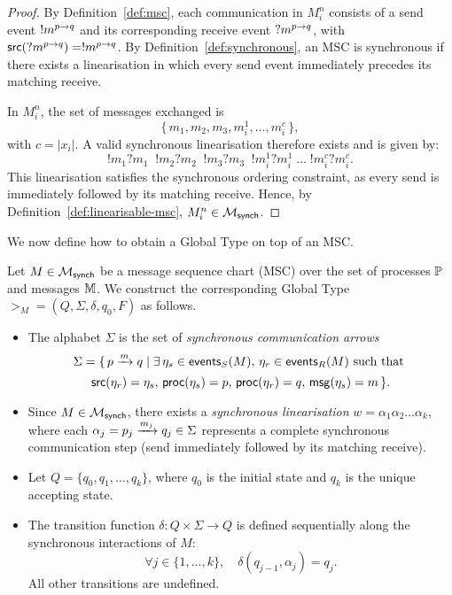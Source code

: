 \begin{proof}
By Definition~\ref{def:msc}, each communication in $M_i^n$
consists of a send event $\send{p}{q}{m}$ and its corresponding
receive event $\recv{p}{q}{m}$, with $\source(\recv{p}{q}{m}) =
\send{p}{q}{m}$.  
By Definition~\ref{def:synchronous}, an MSC is synchronous
if there exists a linearisation in which every send event
immediately precedes its matching receive.

In $M_i^n$, the set of messages exchanged is
\[
\{\, m_1, m_2, m_3, m_i^1, \ldots, m_i^c \,\},
\]
with $c = |x_i|$.  
A valid synchronous linearisation therefore exists and is given by:
\[
!m_1 ?m_1\;\; !m_2 ?m_2\;\; !m_3 ?m_3\;\;
!m_i^1 ?m_i^1 \;\ldots\; !m_i^c ?m_i^c.
\]
This linearisation satisfies the synchronous ordering constraint,
as every send is immediately followed by its matching receive.
Hence, by Definition~\ref{def:linearisable-msc},  
$M_i^n \in \mscsetofmodel{\synchmodel}$.
\end{proof}

We now define how to obtain a Global Type on top of an MSC.

\bigskip

\begin{definition}[$\gt_M$]\label{def:gm}
Let $M \in \mscsetofmodel{\synchmodel}$ be a message sequence chart (MSC)  
over the set of processes $\Procs$ and messages $\Messages$.  
We construct the corresponding Global Type $\gt_M = (Q, \Sigma, \delta, q_0, F)$  
as follows.

\begin{itemize}

    \item
    The alphabet $\Sigma$ is the set of \emph{synchronous communication arrows}  
    \[
        \Sigma = \{\, \marrow{p}{q}{m} \mid 
        \exists \, \event_s \in \sendeventsof{M}, \, 
        \event_r \in \receiveeventsof{M} \text{ such that }
	\]
    \[
        \source(\event_r) = \event_s, \, 
        \processof{\event_s}=p, \, \processof{\event_r}=q, \, 
        \messageof{\event_s}=m \,\}.
    \]

    \item
    Since $M \in \mscsetofmodel{\synchmodel}$, there exists a  
    \emph{synchronous linearisation}  
    $w = \alpha_1 \alpha_2 \ldots \alpha_k$,  
    where each $\alpha_j = \marrow{p_j}{q_j}{m_j} \in \Sigma$  
    represents a complete synchronous communication step (send immediately  
    followed by its matching receive).

    \item
    Let $Q = \{ q_0, q_1, \ldots, q_k \}$,  
    where $q_0$ is the initial state and $q_k$ is the unique accepting state.

    \item
    The transition function $\delta : Q \times \Sigma \to Q$  
    is defined sequentially along the synchronous interactions of $M$:  
    \[
        \forall j \in \{1, \ldots, k\}, \quad  
        \delta(q_{j-1}, \alpha_j) = q_j.
    \]
    All other transitions are undefined.

\end{itemize}

\end{definition}

